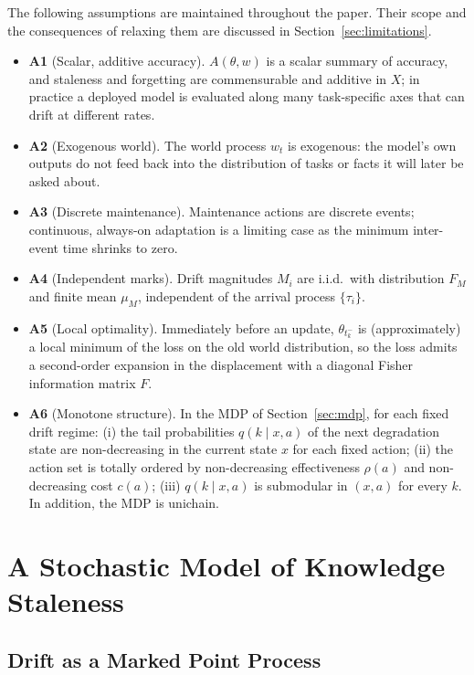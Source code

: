 \documentclass[electronics,article,submit,pdftex,moreauthors]{Definitions/mdpi}
\newcommand{\tkm}{t_k^{-}}
\begin{document}
The following assumptions are maintained throughout the paper. Their scope and the consequences of relaxing them are discussed in Section~\ref{sec:limitations}.
\begin{itemize}
\item \textbf{A1} (Scalar, additive accuracy). $A(\theta,w)$ is a scalar summary of accuracy, and staleness and forgetting are commensurable and additive in $X$; in practice a deployed model is evaluated along many task-specific axes that can drift at different rates.
\item \textbf{A2} (Exogenous world). The world process $w_t$ is exogenous: the model's own outputs do not feed back into the distribution of tasks or facts it will later be asked about.
\item \textbf{A3} (Discrete maintenance). Maintenance actions are discrete events; continuous, always-on adaptation is a limiting case as the minimum inter-event time shrinks to zero.
\item \textbf{A4} (Independent marks). Drift magnitudes $M_i$ are i.i.d.\ with distribution $F_M$ and finite mean $\mu_M$, independent of the arrival process $\{\tau_i\}$.
\item \textbf{A5} (Local optimality). Immediately before an update, $\theta_{\tkm}$ is (approximately) a local minimum of the loss on the old world distribution, so the loss admits a second-order expansion in the displacement with a diagonal Fisher information matrix $F$.
\item \textbf{A6} (Monotone structure). In the MDP of Section~\ref{sec:mdp}, for each fixed drift regime: (i) the tail probabilities $q(k\mid x,a)$ of the next degradation state are non-decreasing in the current state $x$ for each fixed action; (ii) the action set is totally ordered by non-decreasing effectiveness $\rho(a)$ and non-decreasing cost $c(a)$; (iii) $q(k\mid x,a)$ is submodular in $(x,a)$ for every $k$. In addition, the MDP is unichain.
\end{itemize}

\section{A Stochastic Model of Knowledge Staleness}\label{sec:staleness}

\subsection{Drift as a Marked Point Process}
\end{document}
